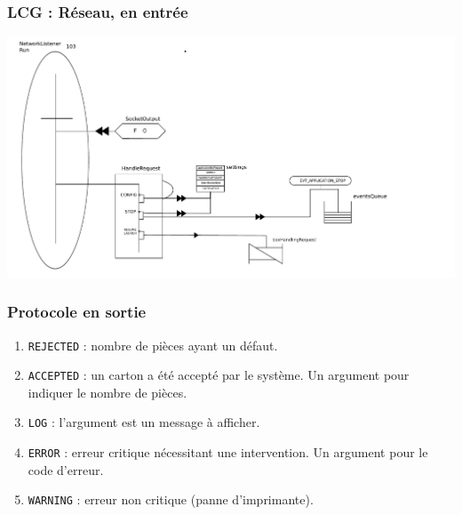 \documentclass{beamer}
\begin{document}
	

	\begin{frame}

	    \frametitle{LCG : Réseau, en entrée}

	    \includegraphics[width=\textwidth]{../SchemasLCG/NetworkListener-run.pdf}

	\end{frame}

	

	\begin{frame}

	\frametitle{Protocole en sortie}

	    \begin{enumerate}

	    \item \texttt{REJECTED} : nombre de pièces ayant un défaut.

	    \item \texttt{ACCEPTED} : un carton a été accepté par le système. Un argument pour indiquer le nombre de pièces.

	    \item \texttt{LOG} : l'argument est un message à afficher.

	    \item \texttt{ERROR} : erreur critique nécessitant une intervention. Un argument pour le code d'erreur.

	    \item \texttt{WARNING} : erreur non critique (panne d'imprimante).

	    \end{enumerate}

	\end{frame}

	
\end{document}
